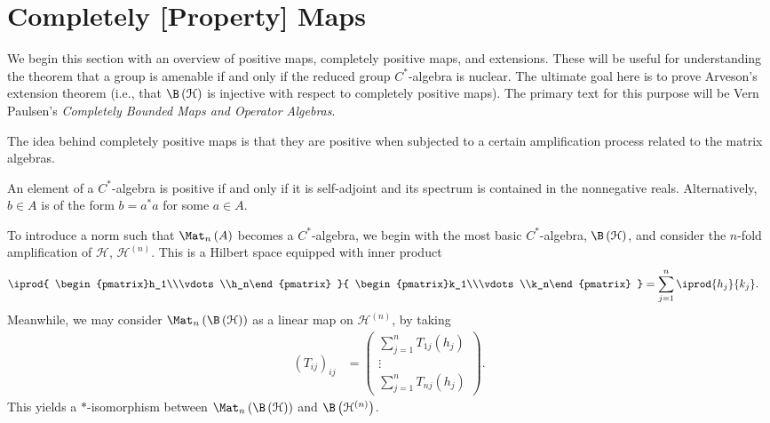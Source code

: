 \documentclass[10pt]{mypackage}
\begin{document}
\section{Completely [Property] Maps}%
We begin this section with an overview of positive maps, completely positive maps, and extensions. These will be useful for understanding the theorem that a group is amenable if and only if the reduced group $C^{\ast}$-algebra is nuclear. The ultimate goal here is to prove Arveson's extension theorem (i.e., that $\B\left( \mathcal{H} \right)$ is injective with respect to completely positive maps). The primary text for this purpose will be Vern Paulsen's \textit{Completely Bounded Maps and Operator Algebras}.\newline

The idea behind completely positive maps is that they are positive when subjected to a certain amplification process related to the matrix algebras.
\begin{definition}
  An element of a $C^{\ast}$-algebra is positive if and only if it is self-adjoint and its spectrum is contained in the nonnegative reals. Alternatively, $b\in A$ is of the form $b = a^{\ast}a$ for some $a\in A$.
\end{definition}
To introduce a norm such that $\Mat_n\left( A \right)$ becomes a $C^{\ast}$-algebra, we begin with the most basic $C^{\ast}$-algebra, $\B\left( \mathcal{H} \right)$, and consider the $n$-fold amplification of $\mathcal{H}$, $\mathcal{H}^{(n)}$. This is a Hilbert space equipped with inner product
\begin{align*}
  \iprod{ \begin{pmatrix}h_1\\\vdots\\h_n\end{pmatrix} }{ \begin{pmatrix}k_1\\\vdots\\k_n\end{pmatrix} } &= \sum_{j=1}^{n} \iprod{h_j}{k_j}.
\end{align*}
Meanwhile, we may consider $\Mat_n\left( \B\left( \mathcal{H} \right) \right)$ as a linear map on $\mathcal{H}^{(n)}$, by taking
\begin{align*}
  \left( T_{ij} \right)_{ij} &= \begin{pmatrix}\sum_{j=1}^{n}T_{1j}\left( h_j \right)\\\vdots\\\sum_{j=1}^{n}T_{nj}\left( h_j \right)\end{pmatrix}.
\end{align*}
This yields a $\ast$-isomorphism between $\Mat_n\left( \B\left( \mathcal{H} \right) \right)$ and $\B\left( \mathcal{H}^{(n)} \right)$.\newline
\end{document}
